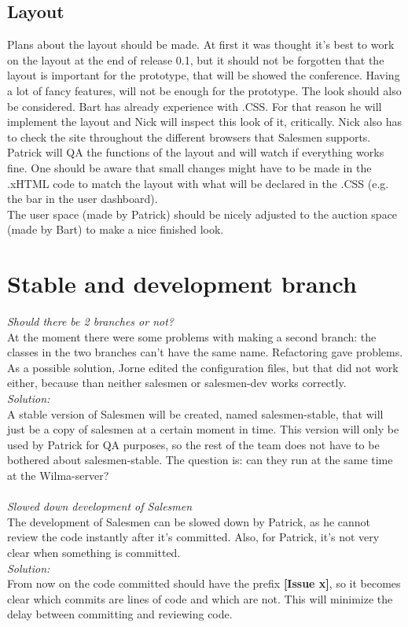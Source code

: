 \documentclass[a4paper, 12pt]{article}
\begin{document}
		\subsection{Layout} 
Plans about the layout should be made. At first it was thought it's best to work on the layout at the end of release 0.1, but it should not be forgotten that the layout is important for the prototype, that will be showed the conference. Having a lot of fancy features, will not be enough for the prototype. The look should also be considered.
Bart has already experience with .CSS. For that reason he will implement the layout and Nick will inspect this look of it, critically. Nick also has to check the site throughout the different browsers that Salesmen supports. Patrick will QA the functions of the layout and will watch if everything works fine.
One should be aware that small changes might have to be made in the .xHTML code to match the layout with what will be declared in the .CSS (e.g. the bar in the user dashboard).\\
The user space (made by Patrick) should be nicely adjusted to the auction space (made by Bart) to make a nice finished look.

	\section{Stable and development branch}
		\textit{Should there be 2 branches or not?}\\
At the moment there were some problems with making a second branch: the classes in the two branches can't have the same name. Refactoring gave problems. As a possible solution, Jorne edited the configuration files, but that did not work either, because than neither salesmen or salesmen-dev works correctly.\\
		\textit{Solution:}\\
A stable version of Salesmen will be created, named salesmen-stable, that will just be a copy of salesmen at a certain moment in time. This version will only be used by Patrick for QA purposes, so the rest of the team does not have to be bothered about salesmen-stable. The question is: can they run at the same time at the Wilma-server?\\ \\
		\textit{Slowed down development of Salesmen}\\
The development of Salesmen can be slowed down by Patrick, as he cannot review the code instantly after it's committed. Also, for Patrick, it's not very clear when something is committed. \\
		\textit{Solution:}\\
From now on the code committed should have the prefix \textbf{[Issue x]}, so it becomes clear which commits are lines of code and which are not. This will minimize the delay between committing and reviewing code.
\end{document}
